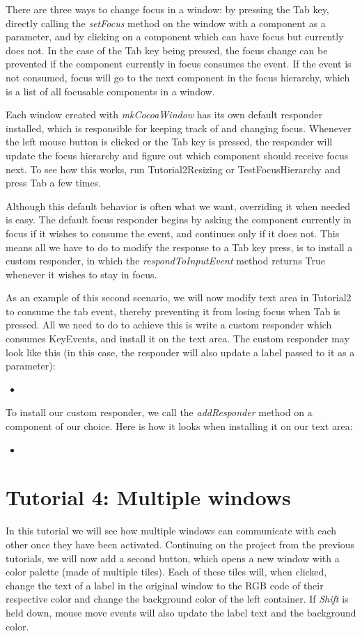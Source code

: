 \documentclass[a4paper]{article}
\newcommand{\timbercode}[2]
  {\begin{itemize}\item[]\end{itemize}}
\begin{document}
There are three ways to change focus in a window: by pressing the Tab key, directly calling the \textit{setFocus} method on the window with a component as a parameter, and by clicking on a component which can have focus but currently does not. In the case of the Tab key being pressed, the focus change can be prevented if the component currently in focus consumes the event. If the event is not consumed, focus will go to the next component in the focus hierarchy, which is a list of all focusable components in a window.

Each window created with \textit{mkCocoaWindow} has its own default responder installed, which is responsible for keeping track of and changing focus. Whenever the left mouse button is clicked or the Tab key is pressed, the responder will update the focus hierarchy and figure out which component should receive focus next. To see how this works, run Tutorial2Resizing or TestFocusHierarchy and press Tab a few times.

Although this default behavior is often what we want, overriding it when needed is easy. The default focus responder begins by asking the component currently in focus if it wishes to consume the event, and continues only if it does not. This means all we have to do to modify the response to a Tab key press, is to install a custom responder, in which the \textit{respondToInputEvent} method returns True whenever it wishes to stay in focus.

As an example of this second scenario, we will now modify text area in Tutorial2 to consume the tab event, thereby preventing it from losing focus when Tab is pressed. All we need to do to achieve this is write a custom responder which consumes KeyEvents, and install it on the text area. The custom responder may look like this (in this case, the responder will also update a label passed to it as a parameter):

\timbercode{tutorial3part0}{}

To install our custom responder, we call the \textit{addResponder} method on a component of our choice. Here is how it looks when installing it on our text area:
\timbercode{tutorial3part1}{}

\section*{Tutorial 4: Multiple windows}
In this tutorial we will see how multiple windows can communicate with each other once they have been activated. Continuing on the project from the previous tutorials, we will now add a second button, which opens a new window with a color palette (made of multiple tiles). Each of these tiles will, when clicked, change the text of a label in the original window to the RGB code of their respective color and change the background color of the left container. If \textit{Shift} is held down, mouse move events will also update the label text and the background color.
\end{document}
